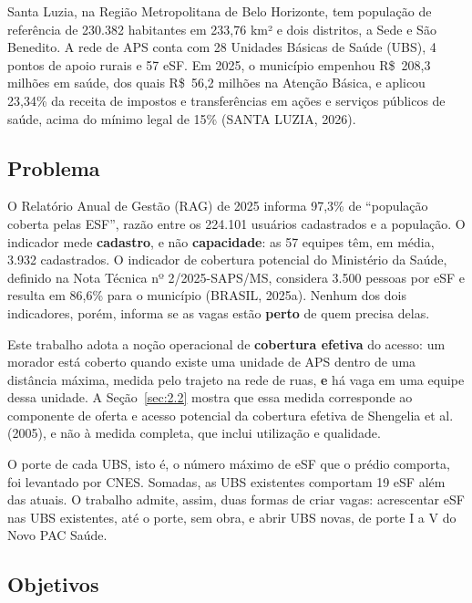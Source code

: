 \documentclass[11pt,a4paper]{article}
\begin{document}
Santa Luzia, na Região Metropolitana de Belo Horizonte, tem população de referência de 230.382 habitantes em 233,76 km² e dois distritos, a Sede e São Benedito. A rede de APS conta com 28 Unidades Básicas de Saúde (UBS), 4 pontos de apoio rurais e 57 eSF. Em 2025, o município empenhou R\$~208,3 milhões em saúde, dos quais R\$~56,2 milhões na Atenção Básica, e aplicou 23,34\% da receita de impostos e transferências em ações e serviços públicos de saúde, acima do mínimo legal de 15\% (SANTA LUZIA, 2026).

\subsection{Problema}\label{sec:1.2}

O Relatório Anual de Gestão (RAG) de 2025 informa 97,3\% de ``população coberta pelas ESF'', razão entre os 224.101 usuários cadastrados e a população. O indicador mede \textbf{cadastro}, e não \textbf{capacidade}: as 57 equipes têm, em média, 3.932 cadastrados. O indicador de cobertura potencial do Ministério da Saúde, definido na Nota Técnica nº 2/2025-SAPS/MS, considera 3.500 pessoas por eSF e resulta em 86,6\% para o município (BRASIL, 2025a). Nenhum dos dois indicadores, porém, informa se as vagas estão \textbf{perto} de quem precisa delas.

Este trabalho adota a noção operacional de \textbf{cobertura efetiva} do acesso: um morador está coberto quando existe uma unidade de APS dentro de uma distância máxima, medida pelo trajeto na rede de ruas, \textbf{e} há vaga em uma equipe dessa unidade. A Seção~\ref{sec:2.2} mostra que essa medida corresponde ao componente de oferta e acesso potencial da cobertura efetiva de Shengelia et al. (2005), e não à medida completa, que inclui utilização e qualidade.

O porte de cada UBS, isto é, o número máximo de eSF que o prédio comporta, foi levantado por CNES. Somadas, as UBS existentes comportam 19 eSF além das atuais. O trabalho admite, assim, duas formas de criar vagas: acrescentar eSF nas UBS existentes, até o porte, sem obra, e abrir UBS novas, de porte I a V do Novo PAC Saúde.

\subsection{Objetivos}\label{sec:1.3}
\end{document}
